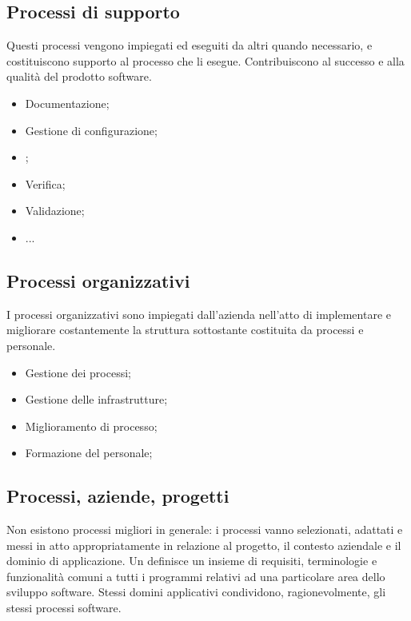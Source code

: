 \subsection{Processi di supporto}

Questi processi vengono impiegati ed eseguiti da altri quando necessario, e
costituiscono supporto al processo che li esegue. Contribuiscono al successo e
alla qualità del prodotto software.

\begin{itemize}
  \item Documentazione;
  \item Gestione di configurazione;
  \item {};
  \item Verifica;
  \item Validazione;
  \item ...
\end{itemize}

\subsection{Processi organizzativi}

I processi organizzativi sono impiegati dall'azienda nell'atto di implementare e
migliorare costantemente la struttura sottostante costituita da processi e
personale.

\begin{itemize}
  \item Gestione dei processi;
  \item Gestione delle infrastrutture;
  \item Miglioramento di processo;
  \item Formazione del personale;
\end{itemize}

\subsection{Processi, aziende, progetti}

Non esistono processi migliori in generale: i processi vanno selezionati,
adattati e messi in atto appropriatamente in relazione al progetto, il contesto
aziendale e il dominio di applicazione. Un 
definisce un insieme di requisiti, terminologie e funzionalità comuni a tutti i
programmi relativi ad una particolare area dello sviluppo software. Stessi
domini applicativi condividono, ragionevolmente, gli stessi processi software.

